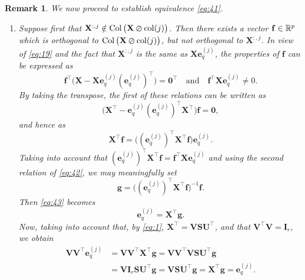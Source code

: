\documentclass[11pt,a4paper]{article}
\theoremstyle{break}
\numberwithin{dummy}{section}
\theoremstyle{plain}
\theoremstyle{plain}
\theoremstyle{plain}
\theoremstyle{plain}
\theoremstyle{plain}
\newtheorem{remark}{Remark}[section]
\theoremstyle{MyNonumberplain}
\DeclareMathOperator{\col}{Col}
\newcommand{\0}{\M{0}}
\newcommand{\M}[1]{\mathbf{#1}}
\newcommand{\R}{\mathbb{R}}
\newcommand{\T}{\top}
\newcommand{\ve}[1]{\mathbf{#1}}
\newcommand{\eve}[2]{\mathbf{e}^{(#1)}_{#2}}
\newcommand{\Mat}[2]{%
  \ifthenelse{\equal{#2}{1}}
  {\R^{#1}}
  {\R^{#1 \times #2}}
}
\newcommand{\zercol}[2]{\M{#1} \varoslash \mathrm{col}(#2)}
\begin{document}
\begin{remark}
  We now proceed to establish equivalence \eqref{eq:41}.
  \begin{enumerate}[font=\upshape,label=(\roman*),wide,align=right]
  \item Suppose first that $\M{X}^{:,j} \notin \col \big( \zercol{X}{j} \big)$. Then there exists a vector $\ve{f} \in \Mat{p}{1}$ which is orthogonal to $\col \big( \zercol{X}{j} \big)$, but not orthogonal to $\M{X}^{:,j}$. In view of \eqref{eq:19} and the fact that $\M{X}^{:,j}$ is the same as $\M{X}\eve{j}{q}$, the properties of $\ve{f}$ can be expressed as
    \begin{equation}
      \label{eq:42}
      \ve{f}^\T \big(\M{X} - \M{X} \eve{j}{q} (\eve{j}{q})^\T \big) = \0^\T
      \quad
      \text{and}
      \quad
      \ve{f}^\T \M{X}\eve{j}{q} \neq 0.
    \end{equation}
    By taking the transpose, the first of these relations can be written as
    \begin{displaymath}
      \big( \M{X}^\T -  \eve{j}{q} (\eve{j}{q})^\T \M{X}^\T \big) \ve{f} = \0,
    \end{displaymath}
    and hence as
    \begin{equation}
      \label{eq:43}
      \M{X}^\T \ve{f}
      =
      \big( (\eve{j}{q})^\T \M{X}^\T \ve{f} \big) \eve{j}{q}.
    \end{equation}
    Taking into account that
    \begin{math}
      (\eve{j}{q})^\T \M{X}^\T \ve{f} = \ve{f}^\T \M{X}\eve{j}{q}
    \end{math}
    and using the second relation of \eqref{eq:42}, we may meaningfully set
    \begin{displaymath}
      \ve{g} = \big( (\eve{j}{q})^\T \M{X}^\T \ve{f} \big)^{-1} \ve{f}.
    \end{displaymath}
    Then \eqref{eq:43} becomes
    \begin{displaymath}
      \eve{j}{q} = \M{X}^\T \ve{g}.
    \end{displaymath}
    Now, taking into account that, by \eqref{eq:1}, $\M{X}^\T = \M{V} \M{S} \M{U}^\T$, and that $\M{V}^\T \M{V} = \M{I}_r$, we obtain
    \begin{align*}
      \M{V} \M{V}^\T \eve{j}{q}
      & =
        \M{V} \M{V}^\T \M{X}^\T \ve{g}
        =
        \M{V} \M{V}^\T \M{V} \M{S} \M{U}^\T \ve{g}
      \\
      & =
        \M{V} \M{I}_r \M{S} \M{U}^\T \ve{g}
        =
        \M{V} \M{S} \M{U}^\T \ve{g}
        =
        \M{X}^\T \ve{g}
        =
        \eve{j}{q}.

\end{align*}
\end{enumerate}
\end{remark}
\end{document}
